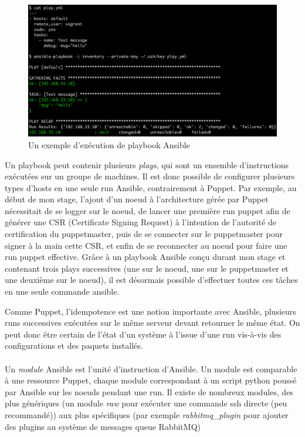 \documentclass[14 pt]{extreport}
\begin{document}
\begin{figure}[htp]
\centering
\includegraphics[scale=1.10]{play.png}
\caption{Un exemple d'exécution de playbook Ansible}
\label{}
\end{figure}

Un playbook peut contenir plusieurs \emph{plays}, qui sont un ensemble d'instructions exécutées sur un groupe de machines. Il est donc possible de configurer plusieurs types d'hosts en une seule run Ansible, contrairement à Puppet. Par exemple, au début de mon stage, l'ajout d'un noeud à l'architecture gérée par Puppet nécessitait de se logger sur le noeud, de lancer une première run puppet afin de générer une CSR (Certificate Signing Request) à l'intention de l'autorité de certification du puppetmaster, puis de se connecter sur le puppetmaster pour signer à la main cette CSR, et enfin de se reconnecter au noeud pour faire une run puppet effective. Grâce à un playbook Ansible conçu durant mon stage et contenant trois plays successives (une sur le noeud, une sur le puppetmaster et une deuxième sur le noeud), il est désormais possible d'effectuer toutes ces tâches en une seule commande ansible.

Comme Puppet, l'idempotence est une notion importante avec Ansible, plusieurs runs successives exécutées sur le même serveur devant retourner le même état. On peut donc être certain de l'état d'un système à l'issue d'une run vis-à-vis des configurations et des paquets installés.

\paragraph{}Un \emph{module} Ansible est l'unité d'instruction d'Ansible. Un module est comparable à une ressource Puppet, chaque module correspondant à un script python poussé par Ansible sur les noeuds pendant une run. Il existe de nombreux modules, des plus génériques (un module \emph{raw} pour exécuter une commande ssh directe (peu recommandé)) aux plus spécifiques (par exemple \emph{rabbitmq\_plugin} pour ajouter des plugins au système de messages queue RabbitMQ)
\end{document}
